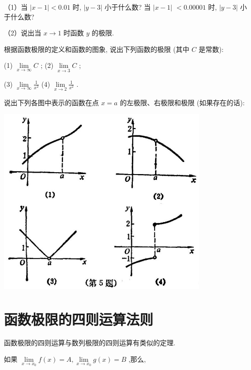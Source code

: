 \documentclass[lang=cn,newtx,10pt,scheme=chinese]{elegantbook}
\begin{document}
\begin{problemset}[练习]
	（1）当 \(\left| {x - 1}\right| < {0.01}\) 时, \(\left| {y - 3}\right|\) 小于什么数? 当 \(\left| {x - 1}\right|\) \(< {0.00001}\) 时, \(\left| {y - 3}\right|\) 小于什么数?
	
	（2）说出当 \(x \rightarrow 1\) 时函数 \(y\) 的极限.
	
	\item 根据函数极限的定义和函数的图象, 说出下列函数的极限 (其中 \(C\) 是常数):
	
	(1) \(\mathop{\lim }\limits_{{x \rightarrow \infty }}C\) ; (2) \(\mathop{\lim }\limits_{{x \rightarrow 3}}C\) ;
	
	(3) \(\mathop{\lim }\limits_{{x \rightarrow \infty }}\frac{1}{{x}^{2}}\) (4) \(\mathop{\lim }\limits_{{x \rightarrow 2}}\frac{1}{{x}^{2}}\) .
	
	\item 说出下列各图中表示的函数在点 \(x = a\) 的左极限、右极限和极限 (如果存在的话):
	
	\begin{center}
		\includegraphics[max width=0.8\textwidth]{images/01912c18-5c3f-733d-b775-749ba9897a9d_27_586841.jpg}
	\end{center}
	
\end{problemset}

\section{函数极限的四则运算法则}

函数极限的四则运算与数列极限的四则运算有类似的定理.

如果 \(\mathop{\lim }\limits_{{x \rightarrow {x}_{0}}}f\left( x\right) = A,\mathop{\lim }\limits_{{x \rightarrow {x}_{0}}}g\left( x\right) = B\) ,那么,
\end{document}
